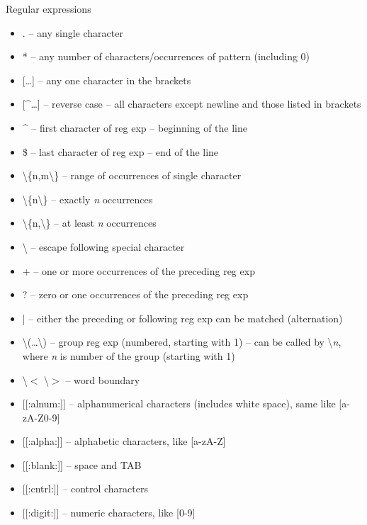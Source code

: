 \documentclass[compress, ucs, xelatex, 11pt, xcolor=svgnames,
  hyperref={
    bookmarks=true,
    unicode=true,
    colorlinks=true,
    pdftitle={Linux, command line and MetaCentrum},
    plainpages=false,
    pdfauthor={Vojtech Zeisek},
    pdfsubject={Course about use of Linux command line, writing shell scripts and using MetaCentrum of CESNET},
    pdfcreator={XeLaTeX},
    pdfkeywords={Linux, GNU, BASH, shell, command line, MetaCentrum},
    linkcolor=Red,
    anchorcolor=Blue,
    citecolor=Purple,
    filecolor=DodgerBlue,
    menucolor=DarkOrchid,
    urlcolor=DeepSkyBlue,
    pdftex},
  url={hyphens, lowtilde} %
  ]{beamer}
\begin{document}
\begin{frame}[allowframebreaks]{Regular expressions}
\label{regexp}
\begin{itemize}
  \item \alert{.} -- any single character
  \item \alert{*} -- any number of characters/occurrences of pattern (including 0)
  \item \alert{[\ldots]} -- any one character in the brackets
  \item \alert{[\textasciicircum\ldots]} -- reverse case -- all characters except newline and those listed in brackets
  \item \alert{\textasciicircum} -- first character of reg exp -- beginning of the line
  \item \alert{\$} -- last character of reg exp -- end of the line
  \item \alert{\textbackslash\{n,m\textbackslash\}} -- range of occurrences of single character
  \item \alert{\textbackslash\{n\textbackslash\}} -- exactly \textit{n} occurrences
  \item \alert{\textbackslash\{n,\textbackslash\}} -- at least \textit{n} occurrences
  \item \alert{\textbackslash} -- escape following special character
  \item \alert{+} -- one or more occurrences of the preceding reg exp
  \item \alert{?} -- zero or one occurrences of the preceding reg exp
  \item \alert{|} -- either the preceding or following reg exp can be matched (alternation)
  \item \alert{\textbackslash(\ldots\textbackslash)} -- group reg exp (numbered, starting with 1) -- can be called by \alert{\textbackslash\textit{n}}, where \textit{n} is number of the group (starting with 1)
  \item \alert{\textbackslash$<$ \textbackslash$>$} -- word boundary
  \item \alert{[[:alnum:]]} -- alphanumerical characters (includes white space), same like \alert{[a-zA-Z0-9]}
  \item \alert{[[:alpha:]]} -- alphabetic characters, like \alert{[a-zA-Z]}
  \item \alert{[[:blank:]]} -- space and TAB
  \item \alert{[[:cntrl:]]} -- control characters
  \item \alert{[[:digit:]]} -- numeric characters, like \alert{[0-9]}

\end{itemize}
\end{frame}
\end{document}
